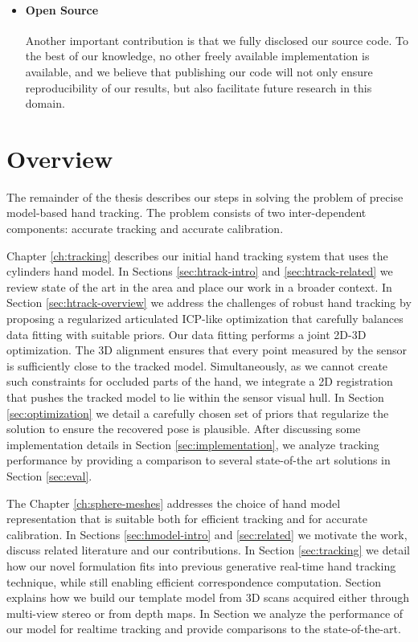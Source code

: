 \begin{itemize}
\item \paragraph{Open Source} Another important contribution is that we fully disclosed our source code. To the best of our knowledge, no other freely available implementation is available, and we believe that publishing our code will not only ensure reproducibility of our results, but also facilitate future research in this domain.

\end{itemize}

\section{Overview}

The remainder of the thesis describes our steps in solving the problem of precise model-based hand tracking. The problem consists of two inter-dependent components: accurate tracking and accurate calibration.

Chapter \ref{ch:tracking} describes our initial hand tracking system that uses the cylinders hand model. 
In Sections \ref{sec:htrack-intro} and \ref{sec:htrack-related} we review state of the art in the area and place our work in a broader context.
In Section  \ref{sec:htrack-overview} we address the challenges of robust hand tracking by proposing a regularized articulated ICP-like optimization that carefully balances data fitting with suitable priors. Our data fitting performs a joint 2D-3D optimization. The 3D alignment ensures that every point measured by the sensor is sufficiently close to the tracked model. Simultaneously, as we cannot create such constraints for occluded parts of the hand, we integrate a 2D registration that pushes the tracked model to lie within the sensor visual hull. In Section \ref{sec:optimization} we detail a carefully chosen set of priors that regularize the solution to ensure the recovered pose is plausible. After discussing some implementation details in Section \ref{sec:implementation}, we analyze tracking performance by providing a comparison to several state-of-the art solutions in Section \ref{sec:eval}.

The Chapter \ref{ch:sphere-meshes} addresses the choice of hand model representation that is suitable both for efficient tracking and for accurate calibration.
In Sections \ref{sec:hmodel-intro} and \ref{sec:related} we motivate the work, discuss related literature and our contributions.
In Section \ref{sec:tracking} we detail how our novel formulation fits into previous generative real-time hand tracking technique, while still enabling efficient correspondence computation. Section \label{sec:modeling} explains how we build our template model from 3D scans acquired either through multi-view stereo or from depth maps. In Section \label{sec:results} we analyze the performance of our model for realtime tracking and provide comparisons to the state-of-the-art. 

